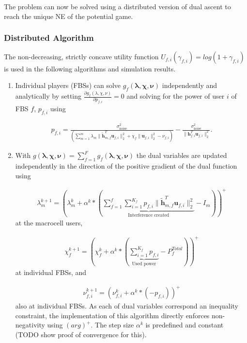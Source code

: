 \documentclass[12pt,a4paper]{report}
\begin{document}
The problem can now be solved using a distributed version of dual ascent to reach the unique NE of the potential game. 
\subsubsection{Distributed Algorithm}\label{algo1}
The non-decreasing, strictly concave utility function $U_{f,i}(\gamma_{f,i}) = log(1+\gamma_{f,i})$ 
is used in the following algorithms and simulation results.

\begin{enumerate}
\item 
Individual players (FBSs) can solve $ g_f(\boldsymbol{\lambda},\boldsymbol{\chi},\boldsymbol{\nu})$ independently and analytically by setting $\frac{\partial g_f(\lambda, \chi, \nu)}{\partial p_{f,i}} = 0$ 
and solving for the power of user $i$ of FBS $f$, $p_{f,i}$ using

\begin{gather}
p_{f,i} = \frac{\sigma^2_{\text{noise}}}{(\sum_{m=1}^{m}\lambda_{m}\|\mathbf{\tilde{h}}_{m,f}^T \mathbf{u}_{f,i}\|^2_2
+\chi_{f} \|\mathbf{u}_{f,i}\|^2_2
-\nu_{f,i}
 )}-
  \frac{\sigma^2_{\text{noise}}}{\|\mathbf{h}_{f,i}^T \mathbf{u}_{f,i}\|^2_2}.
\end{gather}

\item 
With $g(\boldsymbol{\lambda},\boldsymbol{\chi},\boldsymbol{\nu}) = \sum_{f=1}^{F}g_f(\boldsymbol{\lambda},\boldsymbol{\chi},\boldsymbol{\nu})$ the dual variables are updated independently in the direction of the positive gradient of the dual function using

\begin{gather}
\lambda_{m}^{k+1} = (
\lambda_{m}^{k}
+
\alpha^{k}*
(
\underbrace{
\sum _{f=1}^{f}
\sum _{i=1}^{K_{f}}
p_{f,i}
\|\mathbf{\tilde{h}}_{m,f}^T \mathbf{u}_{f,i}\|^2_2}_{\text{Interference created}}
- I_{m}
))^+
\end{gather}
 at the macrocell users,

\begin{gather}
\chi_{f}^{k+1} = (
\chi_{f}^{k}
+
\alpha^{k}*
(\underbrace{\sum_{i=1}^{K_{f}} p_{f,i}}_{\text{Used power}} - P_{f}^{Total}) )^+
\end{gather}
 at individual FBSs, and 

\begin{gather}
\nu_{f,i}^{k+1} = (
\nu_{f,i}^{k}
+
\alpha^{k}*
(-p_{f,i}))^+
\end{gather}
also at individual FBSs.
As each of dual variables correspond an inequality constraint, the implementation of this algorithm directly enforces non-negativity using 
$(arg)^+$.
The step size $\alpha^{k}$ is predefined and constant (TODO show proof of convergence for this).



\end{enumerate} 
\end{document}
